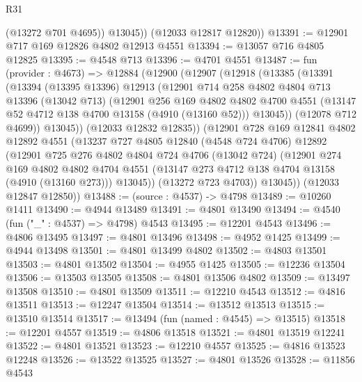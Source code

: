 \begin{lexlean}{R31}
\begin{coremodule}
            (@13272 @701 @4695))
          @13045))
      (@12033 @12817 @12820))
@13391 := @12901 @717 @169 @12826 @4802 @12913 @4551
@13394 := @13057 @716 @4805 @12825
@13395 := @4548 @713
@13396 := @4701 @4551
@13487 := fun (provider : @4673) =>
  @12884
    (@12900
      (@12907
        (@12918
          (@13385
            (@13391
              (@13394
                (@13395 @13396)
                @12913
                (@12901
                  @714
                  @258
                  @4802
                  @4804
                  @713
                  @13396
                  (@13042 @713)
                  (@12901
                    @256
                    @169
                    @4802
                    @4802
                    @4700
                    @4551
                    (@13147 @52 @4712 @138 @4700 @13158 (@4910 (@13160 @52)))
                    @13045))
                (@12078 @712 @4699))
              @13045))
          (@12033 @12832 @12835))
        (@12901
          @728
          @169
          @12841
          @4802
          @12892
          @4551
          (@13237
            @727
            @4805
            @12840
            (@4548 @724 @4706)
            @12892
            (@12901
              @725
              @276
              @4802
              @4804
              @724
              @4706
              (@13042 @724)
              (@12901
                @274
                @169
                @4802
                @4802
                @4704
                @4551
                (@13147 @273 @4712 @138 @4704 @13158 (@4910 (@13160 @273)))
                @13045))
            (@13272 @723 @4703))
          @13045))
      (@12033 @12847 @12850))
@13488 := (source : @4537) -> @4798
@13489 := @10260 @1411
@13490 := @4944 @13489
@13491 := @4801 @13490
@13494 := @4540 (fun ("_" : @4537) => @4798) @4543
@13495 := @12201 @4543
@13496 := @4806 @13495
@13497 := @4801 @13496
@13498 := @4952 @1425
@13499 := @4944 @13498
@13501 := @4801 @13499 @4802
@13502 := @4803 @13501
@13503 := @4801 @13502
@13504 := @4955 @1425
@13505 := @12236 @13504
@13506 := @13503 @13505
@13508 := @4801 @13506 @4802
@13509 := @13497 @13508
@13510 := @4801 @13509
@13511 := @12210 @4543
@13512 := @4816 @13511
@13513 := @12247 @13504
@13514 := @13512 @13513
@13515 := @13510 @13514
@13517 := @13494 (fun (named : @4545) => @13515)
@13518 := @12201 @4557
@13519 := @4806 @13518
@13521 := @4801 @13519 @12241
@13522 := @4801 @13521
@13523 := @12210 @4557
@13525 := @4816 @13523 @12248
@13526 := @13522 @13525
@13527 := @4801 @13526
@13528 := @11856 @4543

\end{coremodule}
\end{lexlean}
